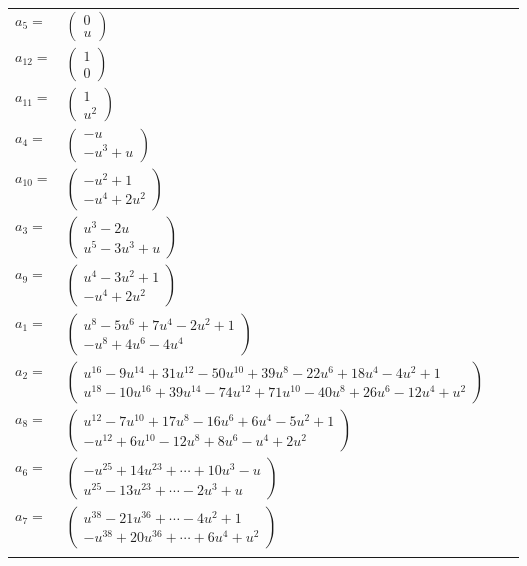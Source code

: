 \documentclass[1p]{elsarticle_modified}
\theoremstyle{definition}
\begin{document}
\begin{tabular}{m{7pt} m{180pt} m{7pt} m{180pt} }
\flushright $a_{5}=$&$\begin{pmatrix}0\\u\end{pmatrix}$ \\
\flushright $a_{12}=$&$\begin{pmatrix}1\\0\end{pmatrix}$ \\
\flushright $a_{11}=$&$\begin{pmatrix}1\\u^2\end{pmatrix}$ \\
\flushright $a_{4}=$&$\begin{pmatrix}- u\\- u^3+u\end{pmatrix}$ \\
\flushright $a_{10}=$&$\begin{pmatrix}- u^2+1\\- u^4+2 u^2\end{pmatrix}$ \\
\flushright $a_{3}=$&$\begin{pmatrix}u^3-2 u\\u^5-3 u^3+u\end{pmatrix}$ \\
\flushright $a_{9}=$&$\begin{pmatrix}u^4-3 u^2+1\\- u^4+2 u^2\end{pmatrix}$ \\
\flushright $a_{1}=$&$\begin{pmatrix}u^8-5 u^6+7 u^4-2 u^2+1\\- u^8+4 u^6-4 u^4\end{pmatrix}$ \\
\flushright $a_{2}=$&$\begin{pmatrix}u^{16}-9 u^{14}+31 u^{12}-50 u^{10}+39 u^8-22 u^6+18 u^4-4 u^2+1\\u^{18}-10 u^{16}+39 u^{14}-74 u^{12}+71 u^{10}-40 u^8+26 u^6-12 u^4+u^2\end{pmatrix}$ \\
\flushright $a_{8}=$&$\begin{pmatrix}u^{12}-7 u^{10}+17 u^8-16 u^6+6 u^4-5 u^2+1\\- u^{12}+6 u^{10}-12 u^8+8 u^6- u^4+2 u^2\end{pmatrix}$ \\
\flushright $a_{6}=$&$\begin{pmatrix}- u^{25}+14 u^{23}+\cdots+10 u^3- u\\u^{25}-13 u^{23}+\cdots-2 u^3+u\end{pmatrix}$ \\
\flushright $a_{7}=$&$\begin{pmatrix}u^{38}-21 u^{36}+\cdots-4 u^2+1\\- u^{38}+20 u^{36}+\cdots+6 u^4+u^2\end{pmatrix}$\\&\end{tabular}
\end{document}
